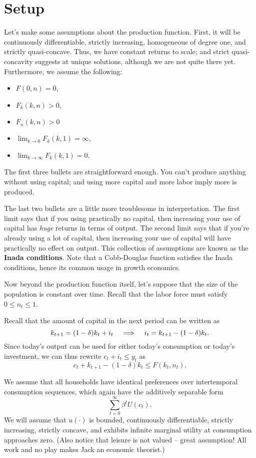 \documentclass[12pt]{article}
\newcommand{\Lindent}{\hspace{.4cm} \Longrightarrow \hspace{.4cm}}
\theoremstyle{definition}
\begin{document}
\section{Setup}

Let's make some assumptions about the production function. First, it will be continuously differentiable, strictly increasing, homogeneous of degree one, and strictly quasi-concave. Thus, we have constant returns to scale; and strict quasi-concavity suggests at unique solutions, although we are not quite there yet. Furthermore, we assume the following:
\begin{itemize}
	\itemsep0em
	\item $F(0,n)=0$,
	\item $F_k(k,n)>0$,
	\item $F_n(k,n) >0$
	\item $\lim_{k \rightarrow 0} F_k(k,1) = \infty$,
	\item $\lim_{k \rightarrow \infty} F_k(k,1) = 0$.
\end{itemize}
The first three bullets are straightforward enough. You can't produce anything without using capital; and using more capital and more labor imply more is produced.

The last two bullets are a little more troublesome in interpretation. The first limit says that if you using practically no capital, then increasing your use of capital has \emph{huge} returns in terms of output. The second limit says that if you're already using a lot of capital, then increasing your use of capital will have practically no effect on output. This collection of assumptions are known as the \textbf{Inada conditions}. Note that a Cobb-Douglas function satisfies the Inada conditions, hence its common usage in growth economics.

Now beyond the production function itself, let's suppose that the size of the population is constant over time. Recall that the labor force must satisfy $0 \leq n_t \leq 1$. 

Recall that the amount of capital in the next period can be written as 
	\[k_{t+1} = (1 - \delta)k_t + i_t \Lindent i_t = k_{t+1} - (1 - \delta)k_t.\]
Since today's output can be used for either today's consumption or today's investment, we can thus rewrite $c_t + i_t \leq y_t$ as 
	\[c_t + k_{t+1} - (1 - \delta)k_t \leq F(k_t, n_t).	\]	

We assume that all households have identical preferences over intertemporal consumption sequences, which again have the additively separable form 
	\[	\sum_{t=0}^{\infty} \beta^t U(c_t).\]
We will assume that $u(\cdot)$ is bounded, continuously differentiable, strictly increasing, strictly concave, and exhibits infinite marginal utility at consumption approaches zero. (Also notice that leisure is not valued -- great assumption! All work and no play makes Jack an economic theorist.) 
\end{document}
